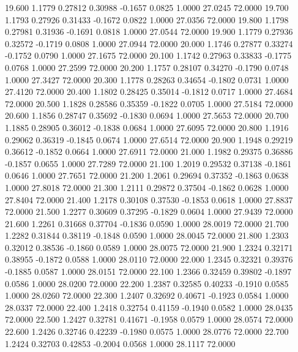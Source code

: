   19.600   1.1779   0.27812   0.30988  -0.1657   0.0825   1.0000  27.0245  72.0000
  19.700   1.1793   0.27926   0.31433  -0.1672   0.0822   1.0000  27.0356  72.0000
  19.800   1.1798   0.27981   0.31936  -0.1691   0.0818   1.0000  27.0544  72.0000
  19.900   1.1779   0.27936   0.32572  -0.1719   0.0808   1.0000  27.0944  72.0000
  20.000   1.1746   0.27877   0.33274  -0.1752   0.0790   1.0000  27.1675  72.0000
  20.100   1.1742   0.27963   0.33833  -0.1775   0.0768   1.0000  27.2599  72.0000
  20.200   1.1757   0.28107   0.34270  -0.1790   0.0748   1.0000  27.3427  72.0000
  20.300   1.1778   0.28263   0.34654  -0.1802   0.0731   1.0000  27.4120  72.0000
  20.400   1.1802   0.28425   0.35014  -0.1812   0.0717   1.0000  27.4684  72.0000
  20.500   1.1828   0.28586   0.35359  -0.1822   0.0705   1.0000  27.5184  72.0000
  20.600   1.1856   0.28747   0.35692  -0.1830   0.0694   1.0000  27.5653  72.0000
  20.700   1.1885   0.28905   0.36012  -0.1838   0.0684   1.0000  27.6095  72.0000
  20.800   1.1916   0.29062   0.36319  -0.1845   0.0674   1.0000  27.6514  72.0000
  20.900   1.1948   0.29219   0.36612  -0.1852   0.0664   1.0000  27.6911  72.0000
  21.000   1.1982   0.29375   0.36886  -0.1857   0.0655   1.0000  27.7289  72.0000
  21.100   1.2019   0.29532   0.37138  -0.1861   0.0646   1.0000  27.7651  72.0000
  21.200   1.2061   0.29694   0.37352  -0.1863   0.0638   1.0000  27.8018  72.0000
  21.300   1.2111   0.29872   0.37504  -0.1862   0.0628   1.0000  27.8404  72.0000
  21.400   1.2178   0.30108   0.37530  -0.1853   0.0618   1.0000  27.8837  72.0000
  21.500   1.2277   0.30609   0.37295  -0.1829   0.0604   1.0000  27.9439  72.0000
  21.600   1.2261   0.31668   0.37704  -0.1836   0.0590   1.0000  28.0019  72.0000
  21.700   1.2282   0.31844   0.38119  -0.1848   0.0590   1.0000  28.0045  72.0000
  21.800   1.2303   0.32012   0.38536  -0.1860   0.0589   1.0000  28.0075  72.0000
  21.900   1.2324   0.32171   0.38955  -0.1872   0.0588   1.0000  28.0110  72.0000
  22.000   1.2345   0.32321   0.39376  -0.1885   0.0587   1.0000  28.0151  72.0000
  22.100   1.2366   0.32459   0.39802  -0.1897   0.0586   1.0000  28.0200  72.0000
  22.200   1.2387   0.32585   0.40233  -0.1910   0.0585   1.0000  28.0260  72.0000
  22.300   1.2407   0.32692   0.40671  -0.1923   0.0584   1.0000  28.0337  72.0000
  22.400   1.2418   0.32754   0.41159  -0.1940   0.0582   1.0000  28.0435  72.0000
  22.500   1.2427   0.32781   0.41671  -0.1958   0.0579   1.0000  28.0574  72.0000
  22.600   1.2426   0.32746   0.42239  -0.1980   0.0575   1.0000  28.0776  72.0000
  22.700   1.2424   0.32703   0.42853  -0.2004   0.0568   1.0000  28.1117  72.0000
